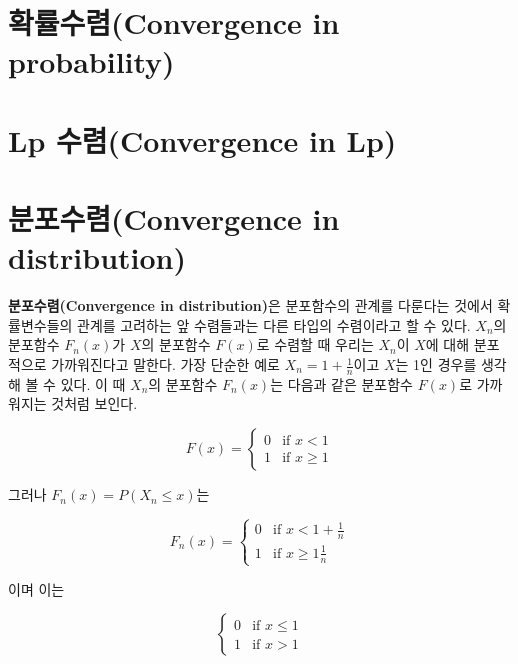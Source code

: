 \documentclass[b5paper,]{scrbook}
\theoremstyle{plain}
\theoremstyle{definition}
\numberwithin{equation}{section}
\begin{document}
\section{확률수렴(Convergence in
probability)}\label{convergence-in-probability}

\section{Lp 수렴(Convergence in Lp)}\label{lp-convergence-in-lp}

\section{분포수렴(Convergence in
distribution)}\label{convergence-in-distribution}

\textbf{분포수렴(Convergence in distribution)}은 분포함수의 관계를
다룬다는 것에서 확률변수들의 관계를 고려하는 앞 수렴들과는 다른 타입의
수렴이라고 할 수 있다. \(X_{n}\)의 분포함수 \(F_{n}(x)\)가 \(X\)의
분포함수 \(F(x)\)로 수렴할 때 우리는 \(X_{n}\)이 \(X\)에 대해 분포적으로
가까워진다고 말한다. 가장 단순한 예로 \(X_{n}=1+\frac{1}{n}\)이고
\(X\)는 1인 경우를 생각해 볼 수 있다. 이 때 \(X_{n}\)의 분포함수
\(F_{n}(x)\)는 다음과 같은 분포함수 \(F(x)\)로 가까워지는 것처럼 보인다.

\begin{equation}
F(x)=
\begin{cases}
0 & \text{if } x < 1 \\
1 & \text{if } x \geq 1 
\end{cases}
\label{eq:distnconvex01}
\end{equation}

그러나 \(F_{n}(x)=P(X_{n}\leq x)\)는

\begin{equation}
F_{n}(x)=
\begin{cases}
0 & \text{if } x < 1 + \frac{1}{n} \\
1 & \text{if } x \geq 1 \frac{1}{n}
\end{cases}
\label{eq:distnconvex02}
\end{equation}

이며 이는

\begin{equation}
\begin{cases}
0 & \text{if } x \leq 1 \\
1 & \text{if } x > 1
\end{cases}
\end{equation}
\end{document}
